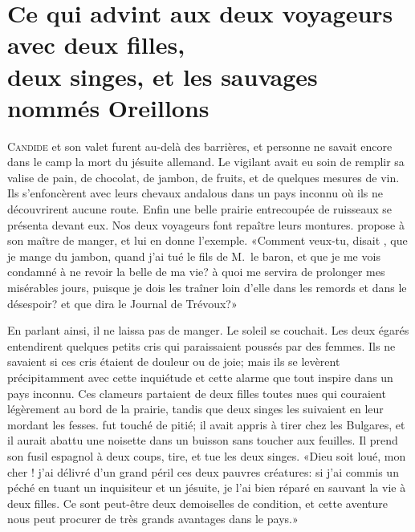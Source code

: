 

\chapter[Ce qui advint aux deux voyageurs…]{Ce qui advint aux deux voyageurs avec deux filles,\\ deux singes, et les
sauvages nommés Oreillons}


\lettrine{C}{andide} et son valet furent au-delà des barrières, et personne ne
savait encore dans le camp la mort du jésuite allemand. Le vigilant
 avait eu soin de remplir sa valise de pain, de chocolat, de
jambon, de fruits, et de quelques mesures de vin. Ils s’enfoncèrent
avec leurs chevaux andalous dans un pays inconnu où ils ne découvrirent
aucune route. Enfin une belle prairie entrecoupée de ruisseaux se
présenta devant eux. Nos deux voyageurs font repaître leurs montures.
 propose à son maître de manger, et lui en donne l’exemple.
«Comment veux-tu, disait , que je mange du jambon, quand j’ai tué
le fils de M.~le baron, et que je me vois condamné à ne revoir la
belle  de ma vie? à quoi me servira de prolonger mes
misérables jours, puisque je dois les traîner loin d’elle dans les
remords et dans le désespoir? et que dira le Journal de Trévoux?»


En parlant ainsi, il ne laissa pas de manger. Le soleil se couchait.
Les deux égarés entendirent quelques petits cris qui paraissaient
poussés par des femmes. Ils ne savaient si ces cris étaient de douleur
ou de joie; mais ils se levèrent précipitamment avec cette inquiétude
et cette alarme que tout inspire dans un pays inconnu. Ces clameurs
partaient de deux filles toutes nues qui couraient légèrement au bord
de la prairie, tandis que deux singes les suivaient en leur mordant les
fesses.  fut touché de pitié; il avait appris à tirer chez les
Bulgares, et il aurait abattu une noisette dans un buisson sans toucher
aux feuilles. Il prend son fusil espagnol à deux coups, tire, et tue
les deux singes. «Dieu soit loué, mon cher ! j’ai délivré d’un
grand péril ces deux pauvres créatures: si j’ai commis un péché en
tuant un inquisiteur et un jésuite, je l’ai bien réparé en sauvant la
vie à deux filles. Ce sont peut-être deux demoiselles de condition, et
cette aventure nous peut procurer de très grands avantages dans le
pays.»


